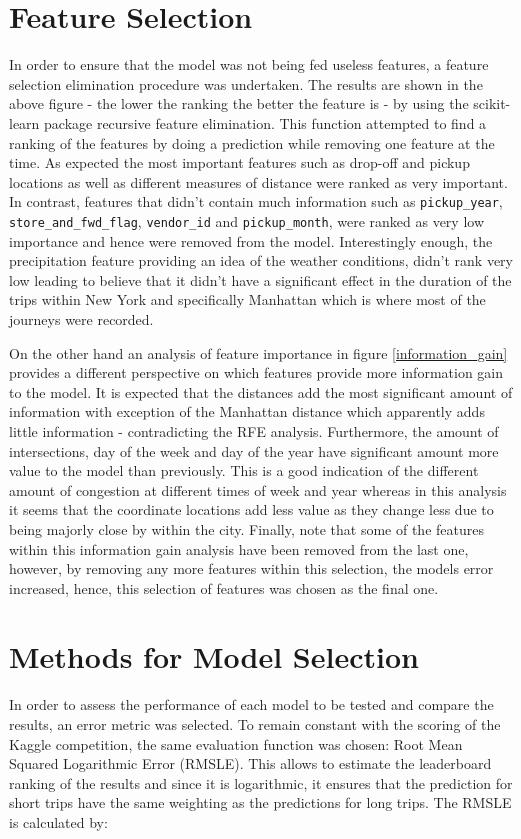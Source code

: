 \documentclass[a4paper]{article}
\begin{document}
\section{Feature Selection}
In order to ensure that the model was not being fed useless features, a feature
selection elimination procedure was undertaken. The results are shown in the
above figure - the lower the ranking the better the feature is - by using the
scikit-learn package recursive feature elimination. This function attempted to
find a ranking of the features by doing a prediction while removing one feature
at the time. As expected the most important features such as drop-off and pickup
locations as well as different measures of distance were ranked as very
important. In contrast,  features that didn’t contain much information such as
\texttt{pickup\_year}, \texttt{store\_and\_fwd\_flag}, \texttt{vendor\_id} and
\texttt{pickup\_month}, were ranked as very low importance and hence were
removed from the model. Interestingly enough, the precipitation feature
providing an idea of the weather conditions, didn’t rank very low leading to
believe that it didn’t have a significant effect in the duration of the trips
within New York and specifically Manhattan which is where most of the journeys
were recorded.

On the other hand an analysis of feature importance in figure \ref{information_gain} provides
a different perspective on which features provide more information gain to the
model. It is expected that the distances add the most significant amount of
information with exception of the Manhattan distance which apparently adds
little information - contradicting the RFE analysis. Furthermore, the amount of
intersections, day of the week and day of the year have significant amount more
value to the model than previously. This is a good indication of the different
amount of congestion at different times of week and year whereas in this
analysis it seems that the coordinate locations add less value as they change
less due to being majorly close by within the city. Finally, note that some of
the features within this information gain analysis have been removed from the
last one, however, by removing any more features within this selection, the
models error increased, hence, this selection of features was chosen as the
final one.

\section{Methods for Model Selection}
In order to assess the performance of each model to be tested and compare the
results, an error metric was selected. To remain constant with the scoring of
the Kaggle competition, the same evaluation function was chosen: Root Mean
Squared Logarithmic Error (RMSLE). This allows to estimate the leaderboard
ranking of the results and since it is logarithmic, it ensures that the
prediction for short trips have the same weighting as the predictions for long
trips. The RMSLE is calculated by:
\end{document}
